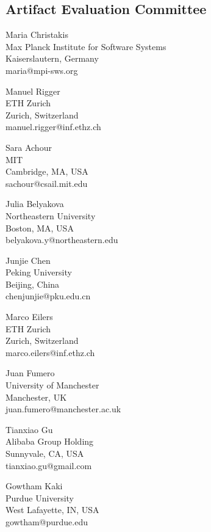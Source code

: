 \documentclass[a4paper,UKenglish]{dartsmaster-v2019}
\begin{document}
\begin{participants}

\chapter[Committee]{Artifact Evaluation Committee}

\participant Maria Christakis\\
	Max Planck Institute for Software Systems\\
	Kaiserslautern, Germany\\
	maria@mpi-sws.org

\participant Manuel Rigger\\
	ETH Zurich\\
	Zurich, Switzerland\\
	manuel.rigger@inf.ethz.ch

\participant Sara Achour\\
  MIT\\
  Cambridge, MA, USA\\
  sachour@csail.mit.edu

\participant Julia Belyakova\\
	Northeastern University\\
	Boston, MA, USA\\
	belyakova.y@northeastern.edu

\participant Junjie Chen\\
	Peking University\\
	Beijing, China\\
	chenjunjie@pku.edu.cn

\participant Marco Eilers\\
	ETH Zurich\\
	Zurich, Switzerland\\
	marco.eilers@inf.ethz.ch

\participant Juan Fumero\\
	University of Manchester\\
	Manchester, UK\\
	juan.fumero@manchester.ac.uk

\participant Tianxiao Gu\\
	Alibaba Group Holding\\
	Sunnyvale, CA, USA\\
	tianxiao.gu@gmail.com

\participant Gowtham Kaki\\
	Purdue University\\
	West Lafayette, IN, USA\\
	gowtham@purdue.edu


\end{participants}
\end{document}
